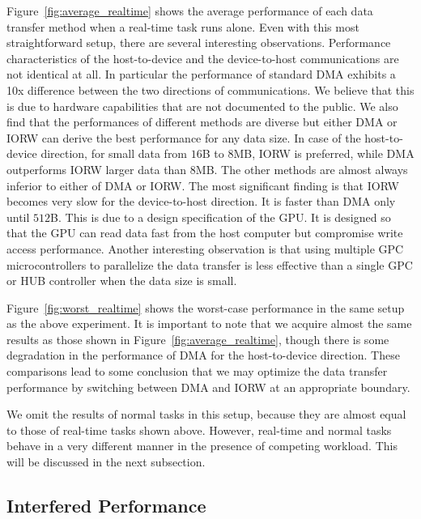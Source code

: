 Figure~\ref{fig:average_realtime} shows the average performance of each
data transfer method when a real-time task runs alone.
Even with this most straightforward setup, there are several interesting
observations.
Performance characteristics of the host-to-device and the device-to-host
communications are not identical at all.
In particular the performance of standard DMA exhibits a 10x difference
between the two directions of communications.
We believe that this is due to hardware capabilities that are not
documented to the public.
We also find that the performances of different methods are diverse but
either \textsf{DMA} or \textsf{IORW} can derive the best performance for
any data size.
In case of the host-to-device direction, for small data from $16$B to
$8$MB, \textsf{IORW} is preferred, while \textsf{DMA} outperforms
\textsf{IORW} larger data than $8$MB.
The other methods are almost always inferior to either of \textsf{DMA}
or \textsf{IORW}.
The most significant finding is that \textsf{IORW} becomes very slow for
the device-to-host direction.
It is faster than \textsf{DMA} only until $512$B.
This is due to a design specification of the GPU.
It is designed so that the GPU can read data fast from the host computer
but compromise write access performance.
Another interesting observation is that using multiple GPC
microcontrollers to parallelize the data transfer is less effective than
a single GPC or HUB controller when the data size is small.

Figure~\ref{fig:worst_realtime} shows the worst-case performance in
the same setup as the above experiment.
It is important to note that we acquire almost the same results as those
shown in Figure~\ref{fig:average_realtime}, though there is
some degradation in the performance of \textsf{DMA} for the
host-to-device direction.
These comparisons lead to some conclusion that we may optimize the data
transfer performance by switching between \textsf{DMA} and \textsf{IORW}
at an appropriate boundary.

We omit the results of normal tasks in this setup, because they are
almost equal to those of real-time tasks shown above.
However, real-time and normal tasks behave in a very different manner in
the presence of competing workload.
This will be discussed in the next subsection.

\subsection{Interfered Performance}
\label{sec:interfered_performance}

